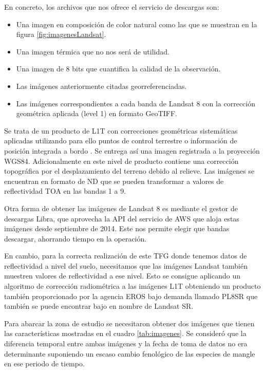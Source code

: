 En concreto, los archivos que nos ofrece el servicio de descargas son:

\begin{itemize}
	\item Una imagen en composición de color natural como las que se muestran en la figura \ref{fig:imagenesLandsat}.
	\item Una imagen térmica que no nos será de utilidad.
	\item Una imagen de 8 bits que cuantifica la calidad de la observación.
	\item Las imágenes anteriormente citadas georreferenciadas.
	\item Las imágenes correspondientes a cada banda de Landsat 8 con la corrección geométrica aplicada (level 1) en formato GeoTIFF.
\end{itemize}\Sep

Se trata de un producto de \ac{L1T} con correcciones geométricas sistemáticas aplicadas utilizando para ello puntos de control terrestre o información de posición integrada a bordo \citep{Ariza2013}. Se entrega así una imagen registrada a la proyección WGS84. Adicionalmente en este nivel de producto contiene una corrección topográfica por el desplazamiento del terreno debido al relieve. Las imágenes se encuentran en formato de \ac{ND} que se pueden transformar a valores de reflectividad \ac{TOA} en las bandas 1 a 9.\Sep

Otra forma de obtener las imágenes de Landsat 8 es mediante el gestor de descargas Libra, que aprovecha la API del servicio de \ac{AWS} que aloja estas imágenes desde septiembre de 2014. Este nos permite elegir que bandas descargar, ahorrando tiempo en la operación.\Sep

En cambio, para la correcta realización de este \ac{TFG} donde tenemos datos de reflectividad a nivel del suelo, necesitamos que las imágenes Landsat también muestren valores de reflectividad a ese nivel. Esto se consigue aplicando un algoritmo de corrección radiométrica a las imágenes \ac{L1T} obteniendo un producto también proporcionado por la agencia \ac{EROS} bajo demanda llamado \ac{PL8SR} \citep{USGS2015} que también se puede encontrar bajo en nombre de Landsat SR.\Sep

Para abarcar la zona de estudio se necesitaron obtener dos imágenes que tienen las características mostradas en el cuadro \ref{tab:imagenes}. Se consideró que la diferencia temporal entre ambas imágenes y la fecha de toma de datos no era determinante suponiendo un escaso cambio fenológico de las especies de mangle en ese periodo de tiempo.\Sep

